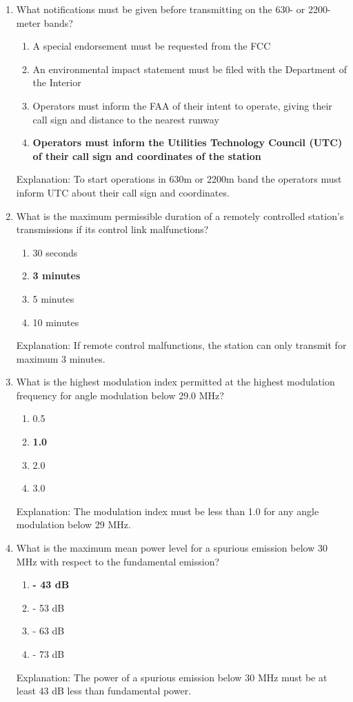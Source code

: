 \begin{enumerate}
     \item What notifications must be given before transmitting on the 630- or 2200-meter bands?
   \begin{enumerate}
         \item A special endorsement must be requested from the FCC
       \item  An environmental impact statement must be filed with the Department of the Interior
    \item  Operators must inform the FAA of their intent to operate, giving their call sign and distance to the nearest runway
      \item \textbf {Operators must inform the Utilities Technology Council (UTC) of their call sign and coordinates of the station}
    \end{enumerate}
        \textcolor{myred}{Explanation:}
         To start operations in 630m or 2200m band the operators must inform UTC about their call sign and coordinates.
      
        \item What is the maximum permissible duration of a remotely controlled station's transmissions if its control link malfunctions?
         \begin{enumerate}
         \item 30 seconds
        \item \textbf {3 minutes}
      \item  5 minutes
        \item  10 minutes
        \end{enumerate}
           \textcolor{myred}{Explanation:}
         If remote control malfunctions, the station can only transmit for maximum 3 minutes.
        
        \item What is the highest modulation index permitted at the highest modulation frequency for angle modulation below 29.0 MHz?
       \begin{enumerate}
        \item 0.5
        \item \textbf {1.0}
       \item  2.0
      \item  3.0
     \end{enumerate}
       \textcolor{myred}{Explanation:}
    The modulation index must be less than 1.0 for any angle modulation below 29 MHz.
        
       \item What is the maximum mean power level for a spurious emission below 30 MHz with respect to the fundamental emission?
        \begin{enumerate}
     \item \textbf {- 43 dB}
        \item  - 53 dB
       \item  - 63 dB
        \item  - 73 dB
    \end{enumerate}
   \textcolor{myred}{Explanation:}
    The power of a spurious emission below 30 MHz must be at least 43 dB less than fundamental power.
       

\end{enumerate}
